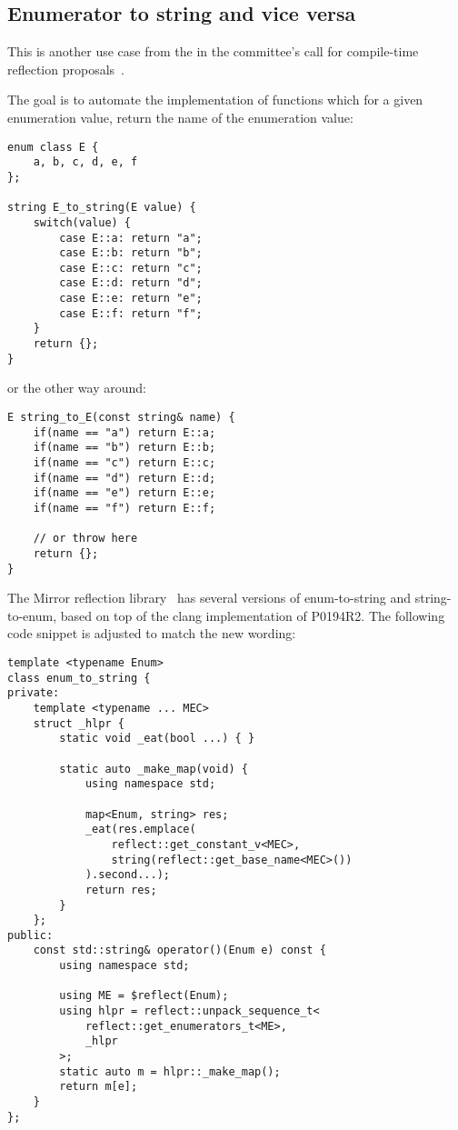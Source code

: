 \subsection{Enumerator to string and vice versa}
\label{use-case-enum-to-string}

This is another use case from the  in the committee's
call for compile-time reflection proposals~\cite{ISOCPP-N3814}. 

The goal is to automate the implementation of functions which for a given
enumeration value, return the name of the enumeration value:

\begin{verbatim}
enum class E {
	a, b, c, d, e, f
};

string E_to_string(E value) {
	switch(value) {
		case E::a: return "a";
		case E::b: return "b";
		case E::c: return "c";
		case E::d: return "d";
		case E::e: return "e";
		case E::f: return "f";
	}
	return {};
}
\end{verbatim}

or the other way around:

\begin{verbatim}
E string_to_E(const string& name) {
	if(name == "a") return E::a;
	if(name == "b") return E::b;
	if(name == "c") return E::c;
	if(name == "d") return E::d;
	if(name == "e") return E::e;
	if(name == "f") return E::f;

	// or throw here
	return {};
}
\end{verbatim}

The Mirror reflection library~\cite{Chochlik-Mirror-new-doc} has several
versions of enum-to-string and string-to-enum, based on top of the clang
implementation of P0194R2. The following code snippet is adjusted to
match the new wording:

\begin{verbatim}
template <typename Enum>
class enum_to_string {
private:
	template <typename ... MEC>
	struct _hlpr {
		static void _eat(bool ...) { }

		static auto _make_map(void) {
			using namespace std;

			map<Enum, string> res;
			_eat(res.emplace(
				reflect::get_constant_v<MEC>,
				string(reflect::get_base_name<MEC>())
			).second...);
			return res;
		}
	};
public:
	const std::string& operator()(Enum e) const {
		using namespace std;

		using ME = $reflect(Enum);
		using hlpr = reflect::unpack_sequence_t<
			reflect::get_enumerators_t<ME>,
			_hlpr
		>;
		static auto m = hlpr::_make_map();
		return m[e];
	}
};
\end{verbatim}


